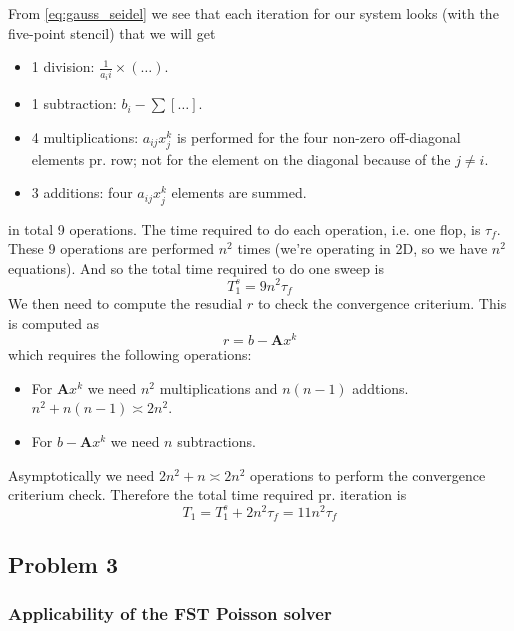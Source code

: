 From \eqref{eq:gauss_seidel} we see that each iteration for our system looks (with the five-point stencil) that we will get
\begin{itemize}
  \item 1 division: $\frac{1}{a_ii}\times(\dots)$.
  \item 1 subtraction: $b_i - \sum[\dots]$.
  \item 4 multiplications: $a_{ij}x_j^k$ is performed for the four non-zero off-diagonal elements pr. row; not for the element on the diagonal because of the $j\neq i$.
  \item 3 additions: four $a_{ij}x_j^k$ elements are summed.
\end{itemize}
in total 9 operations. The time required to do each operation, i.e. one flop, is $\tau_f$. These 9 operations are performed $n^2$ times (we're operating in 2D, so we have $n^2$ equations). And so the total time required to do one sweep is
\begin{equation}
  T_1^s = 9n^2\tau_f
\end{equation}
We then need to compute the resudial $r$ to check the convergence criterium. This is computed as
\begin{equation}
  r = b - \mathbf{A}x^k
\end{equation}
which requires the following operations:
\begin{itemize}
  \item For $\mathbf{A}x^k$ we need $n^2$ multiplications and $n(n-1)$ addtions. $n^2+n(n-1)\asymp 2n^2$.
  \item For $b - \mathbf{A}x^k$ we need $n$ subtractions.
\end{itemize}
Asymptotically we need $2n^2 + n \asymp 2n^2$ operations to perform the convergence criterium check. Therefore the total time required pr. iteration is
\begin{equation}
  T_1 = T_1^s + 2n^2 \tau_f = 11n^2 \tau_f
\end{equation}






\clearpage
\subsection{Problem 3} %
\label{sub:problem_3}

\subsubsection{Applicability of the FST Poisson solver} %
\label{ssub:applicability_of_fst}

